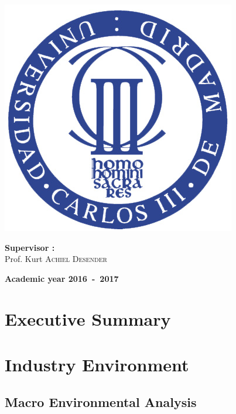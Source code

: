 \documentclass[12pt,a4paper,oneside]{book}
\begin{document}
\begin{titlepage}
\begin{center}
\includegraphics[keepaspectratio=true,width=\textwidth-2cm]{images/Seal_of_the_University_of_Carlos_III.jpg}
\vfill{}
\begin{flushleft}{\large \textbf{Supervisor  :}}\\
{\large Prof. Kurt \textsc{Achiel Desender}}
\end{flushleft}{\large\par}
\vfill{}\vfill{}\enlargethispage{2cm}
\textbf{Academic year 2016~-~2017}
\end{center}
\end{titlepage}



\newpage
\thispagestyle{empty} 
\null


\tableofcontents

\chapter{Executive Summary}

\chapter{Industry Environment}

\section{Macro Environmental Analysis}
\end{document}

